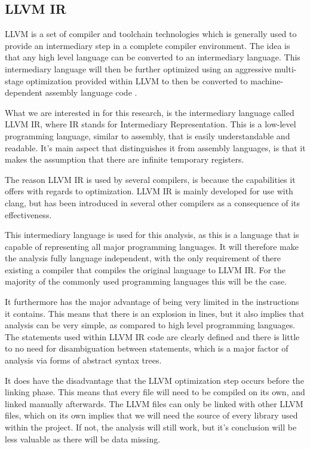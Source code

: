 \documentclass[11pt]{article}
\begin{document}
\begin{multicols}{2}
\section{LLVM IR}
LLVM  is a set of compiler and toolchain technologies which is generally used to provide an intermediary step in a complete compiler environment. The idea is that any high level language can be converted to an intermediary language. This intermediary language will then be further optimized using an aggressive multi-stage optimization provided within LLVM to then be converted to machine-dependent assembly language code \cite{lattner2002llvm}.

What we are interested in for this research, is the intermediary language called LLVM IR, where IR stands for Intermediary Representation. This is a low-level programming language, similar to assembly, that is easily understandable and readable. It's main aspect that distinguishes it from assembly languages, is that it makes the assumption that there are infinite temporary registers. 

The reason LLVM IR is used by several compilers, is because the capabilities it offers with regards to optimization. LLVM IR is mainly developed for use with clang, but has been introduced in several other compilers as a consequence of its effectiveness.

This intermediary language is used for this analysis, as this is a language that is capable of representing all major programming languages. It will therefore make the analysis fully language independent, with the only requirement of there existing a compiler that compiles the original language to LLVM IR. For the majority of the commonly used programming languages this will be the case.

It furthermore has the major advantage of being very limited in the instructions it contains. This means that there is an explosion in lines, but it also implies that analysis can be very simple, as compared to high level programming languages. The statements used within LLVM IR code are clearly defined and there is little to no need for disambiguation between statements, which is a major factor of analysis via forms of abstract syntax trees.

It does have the disadvantage that the LLVM optimization step occurs before the linking phase. This means that every file will need to be compiled on its own, and linked manually afterwards. The LLVM files can only be linked with other LLVM files, which on its own implies that we will need the source of every library used within the project. If not, the analysis will still work, but it's conclusion will be less valuable as there will be data missing.


\end{multicols}
\end{document}
